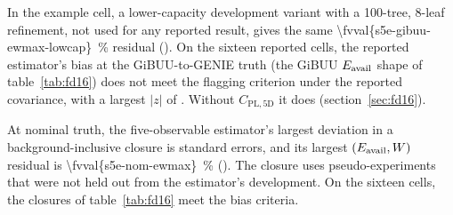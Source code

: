 In the example cell, a lower-capacity development variant with a 100-tree, 8-leaf refinement, not used for any reported result, gives the same \SI{\fvval{s5e-gibuu-ewmax-lowcap}}{\percent} residual (). On the sixteen reported cells, the reported estimator's bias at the GiBUU-to-GENIE truth (the GiBUU $E_{\mathrm{avail}}$ shape of table~\ref{tab:fd16}) does not meet the flagging criterion under the reported covariance, with a largest $|z|$ of . Without $C_{\mathrm{PL,5D}}$ it does (section~\ref{sec:fd16}).

At nominal truth, the five-observable estimator's largest deviation in a background-inclusive closure is  standard errors, and its largest $(E_{\mathrm{avail}},W)$ residual is \SI{\fvval{s5e-nom-ewmax}}{\percent} (). The closure uses  pseudo-experiments that were not held out from the estimator's development. On the sixteen cells, the closures of table~\ref{tab:fd16} meet the bias criteria.

